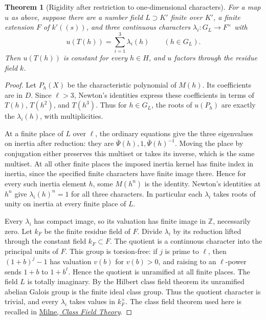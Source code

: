\documentclass[a4paper,11pt]{article}
\newtheorem{theorem}[proposition]{Theorem}
\theoremstyle{definition}
\theoremstyle{remark}
\newcommand{\ZZ}{\mathbb Z}\newcommand{\ord}{\operatorname{ord}}
\numberwithin{equation}{section}
\begin{document}
\begin{theorem}[Rigidity after restriction to one-dimensional characters]\label{thm:chars71}
For a map \(u\) as above, suppose there are a number field
\(L\supset K'\) finite over \(K'\), a finite extension \(F\)
of \(k'((s))\), and three continuous characters
\(\lambda_i:G_L\to F^\times\) with
\[
                 u(T(h))=\sum_{i=1}^3\lambda_i(h)
                 \qquad(h\in G_L).
\]
Then \(u(T(h))\) is constant for every \(h\in H\), and \(u\)
factors through the residue field \(k\).
\end{theorem}
\begin{proof}
Let \(P_h(X)\) be the characteristic polynomial of \(M(h)\).
Its coefficients are in \(D\). Since \(\ell>3\), Newton's
identities express these coefficients in terms of \(T(h)\),
\(T(h^2)\), and \(T(h^3)\). Thus for \(h\in G_L\),
the roots of \(u(P_h)\) are exactly the \(\lambda_i(h)\),
with multiplicities.

At a finite place of \(L\) over \(\ell\), the ordinary equations
give the three eigenvalues on inertia after reduction:
they are \(\bar\Psi(h),1,\bar\Psi(h)^{-1}\). Moving the place
by conjugation either preserves this multiset or takes its
inverse, which is the same multiset. At all other finite places
the imposed inertia kernel has finite index in inertia, since
the specified finite characters have finite image there.
Hence for every such inertia element \(h\), some \(M(h^n)\)
is the identity. Newton's identities at \(h^n\) give
\(\lambda_i(h)^n=1\) for all three characters. In particular each \(\lambda_i\) takes
roots of unity on inertia at every finite place of \(L\).

Every \(\lambda_i\) has compact image, so its valuation has
finite image in \(\ZZ\), necessarily zero. Let \(k_F\) be the
finite residue field of \(F\). Divide \(\lambda_i\) by its
reduction lifted through the constant field \(k_F\subset F\).
The quotient is a continuous character into the principal units
of \(F\). This group is torsion-free: if \(j\) is prime to
\(\ell\), then \((1+b)^j-1\) has valuation \(v(b)\) for
\(v(b)>0\), and raising to an \(\ell\)-power sends \(1+b\)
to \(1+b^{\ell}\). Hence the quotient is unramified at all
finite places. The field \(L\) is totally imaginary. By the
Hilbert class field theorem its unramified abelian Galois group
is the finite ideal class group. Thus the quotient character
is trivial, and every \(\lambda_i\) takes values in \(k_F^\times\).
The class field theorem used here is recalled in
\href{https://www.jmilne.org/math/CourseNotes/CFT.pdf}{Milne, \emph{Class Field Theory}}.


\end{proof}
\end{document}
